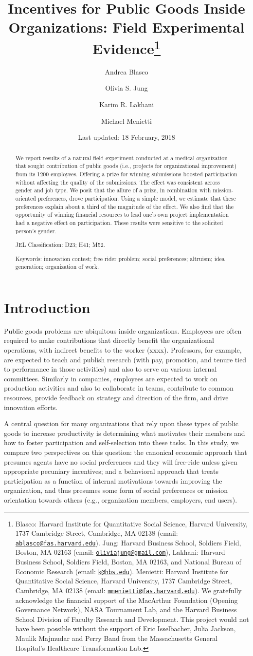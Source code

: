 \documentclass[12pt, titlepage]{article}
\title{Incentives for Public Goods Inside Organizations: Field Experimental
Evidence\thanks{Blasco: Harvard Institute for Quantitative Social Science, Harvard
University, 1737 Cambridge Street, Cambridge, MA 02138 (email:
\href{mailto:ablasco@fas.harvard.edu}{\nolinkurl{ablasco@fas.harvard.edu}}).
Jung: Harvard Business School, Soldiers Field, Boston, MA 02163 (email:
\href{mailto:oliviajung@gmail.com}{\nolinkurl{oliviajung@gmail.com}}),
Lakhani: Harvard Business School, Soldiers Field, Boston, MA 02163, and
National Bureau of Economic Research (email:
\href{mailto:k@hbs.edu}{\nolinkurl{k@hbs.edu}}). Menietti: Harvard
Institute for Quantitative Social Science, Harvard University, 1737
Cambridge Street, Cambridge, MA 02138 (email:
\href{mailto:mmenietti@fas.harvard.edu}{\nolinkurl{mmenietti@fas.harvard.edu}}).
We gratefully acknowledge the financial support of the MacArthur
Foundation (Opening Governance Network), NASA Tournament Lab, and the
Harvard Business School Division of Faculty Research and Development.
This project would not have been possible without the support of Eric
Isselbacher, Julia Jackson, Maulik Majmudar and Perry Band from the
Massachusetts General Hospital's Healthcare Transformation Lab.}}
\author{Andrea Blasco \and Olivia S. Jung \and Karim R. Lakhani \and Michael Menietti}
\date{Last updated: 18 February, 2018}
\begin{document}
\maketitle
\begin{abstract}
We report results of a natural field experiment conducted at a medical
organization that sought contribution of public goods (i.e., projects
for organizational improvement) from its 1200 employees. Offering a
prize for winning submissions boosted participation without affecting
the quality of the submissions. The effect was consistent across gender
and job type. We posit that the allure of a prize, in combination with
mission-oriented preferences, drove participation. Using a simple model,
we estimate that these preferences explain about a third of the
magnitude of the effect. We also find that the opportunity of winning
financial resources to lead one's own project implementation had a
negative effect on participation. These results were sensitive to the
solicited person's gender.

\smallskip\noindent 
JEL Classification: D23; H41; M52.

\smallskip\noindent 
Keywords: innovation contest; free rider problem; social preferences; altruism; idea generation; organization of work.
\end{abstract}


\clearpage
\tableofcontents
\setcounter{tocdepth}{2}
\clearpage

\section{Introduction}\label{introduction}

Public goods problems are ubiquitous inside organizations. Employees are
often required to make contributions that directly benefit the
organizational operations, with indirect benefits to the worker (xxxx).
Professors, for example, are expected to teach and publish research
(with pay, promotion, and tenure tied to performance in those
activities) and also to serve on various internal committees. Similarly
in companies, employees are expected to work on production activities
and also to collaborate in teams, contribute to common resources,
provide feedback on strategy and direction of the firm, and drive
innovation efforts.

A central question for many organizations that rely upon these types of
public goods to increase productivity is determining what motivates
their members and how to foster participation and self-selection into
these tasks. In this study, we compare two perspectives on this
question: the canonical economic approach that presumes agents have no
social preferences and they will free-ride unless given appropriate
pecuniary incentives; and a behavioral approach that treats
participation as a function of internal motivations towards improving
the organization, and thus presumes some form of social preferences or
mission orientation towards others (e.g., organization members,
employers, end users).
\end{document}
